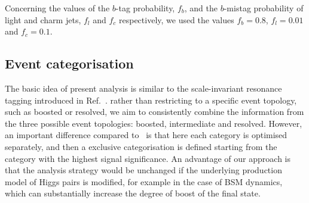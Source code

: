 Concerning the values of the $b$-tag probability, $f_b$, and
the $b$-mistag probability of light and charm jets, $f_l$ and  $f_c$
respectively,
we used the values $f_b=0.8$, $f_l=0.01$
and  $f_c=0.1$.


\subsection{Event categorisation}
\label{sec:categorisation}

The basic idea of present analysis is similar to the
scale-invariant resonance tagging introduced
in Ref.~\cite{Gouzevitch:2013qca}.
%
rather than restricting to a specific event topology, such as boosted
or resolved, we aim to consistently combine the information from
the three possible event topologies: boosted, intermediate and
resolved.
%
However, an important difference compared to~\cite{Gouzevitch:2013qca}
is that here each category is optimised separately, and then
a exclusive categorisation is defined starting from the category
with the highest signal significance.
%
An advantage of our approach is that the analysis strategy would be unchanged
if the underlying production model of Higgs pairs is modified, for example in the case of
BSM dynamics, which can substantially increase the degree of boost of the final state.

